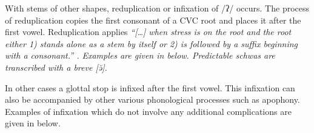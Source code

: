 With stems of other shapes, reduplication or infixation of /ʔ/ occurs.
The process of reduplication copies the first consonant of a CVC root and
places it after the first vowel.
Reduplication applies \it{``[{\ldots}] when stress is on the root and the root either
1) stands alone as a stem by itself or
2) is followed by a suffix beginning with a consonant.''} \citep[95]{mo89}.
Examples are given in  below.
Predictable schwas are transcribed with a breve [ə̆].

\begin{exe}
	\label{ex:C1VC->C1VC1C}
\end{exe}

In other cases a glottal stop is infixed after the first vowel.
This infixation can also be accompanied by other
various phonological processes such as apophony.
Examples of infixation which do not involve any additional complications
are given in  below.

\begin{exe}
	\label{ex:C1VC->C1VqC}
\end{exe}

